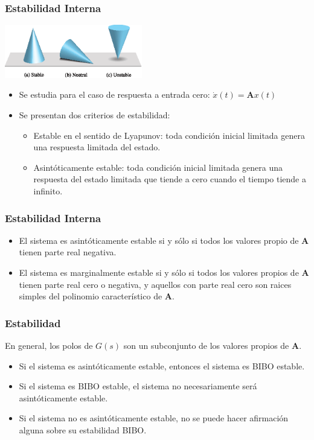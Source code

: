 \documentclass[aspectratio=169,handout]{beamer}
\theoremstyle{definition}
\theoremstyle{plain}
\theoremstyle{remark}
\begin{document}
\begin{frame}[<-+>]\frametitle{Estabilidad Interna}
\centering
\includegraphics[width=6cm]{images/internalStability.eps}
\begin{itemize}
  \item Se estudia para el caso de respuesta a entrada cero: $\dot{x}(t) = \mathbf{A}x(t)$
  \item Se presentan dos criterios de estabilidad:
  \begin{itemize}
    \item Estable en el sentido de Lyapunov: toda condición inicial limitada genera una respuesta limitada del estado.
    \item Asintóticamente estable: toda condición inicial limitada genera una respuesta del estado limitada que tiende a cero cuando el tiempo tiende a infinito.
  \end{itemize}
\end{itemize}
\end{frame}

\begin{frame}[<-+>]\frametitle{Estabilidad Interna}
\begin{theorem}
\begin{itemize}
  \item El sistema es asintóticamente estable si y sólo si todos los valores propio de $\mathbf{A}$ tienen parte real negativa.
  \item El sistema es marginalmente estable si y sólo si todos los valores propios de $\mathbf{A}$ tienen parte real cero o negativa, y aquellos con parte real cero son raices simples del polinomio característico de $\mathbf{A}$.
\end{itemize}
\end{theorem}
\end{frame}

\begin{frame}[<-+>]\frametitle{Estabilidad}
   En general, los polos de $G(s)$ son un subconjunto de los valores propios de $\mathbf{A}$.
   \begin{itemize}
     \item Si el sistema es asintóticamente estable, entonces el sistema es BIBO estable.
     \item Si el sistema es BIBO estable, el sistema no necesariamente será asintóticamente estable.
     \item Si el sistema no es asintóticamente estable, no se puede hacer afirmación alguna sobre su estabilidad BIBO.
   \end{itemize}
\end{frame}
\end{document}
